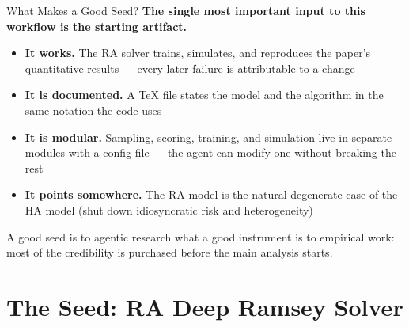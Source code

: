 \documentclass[10pt,aspectratio=169]{beamer}
\begin{document}
\begin{frame}{What Makes a Good Seed?}
\textbf{The single most important input to this workflow is the starting artifact.}

\medskip
\begin{itemize}
    \item \textbf{It works.} The RA solver trains, simulates, and reproduces the paper's
          quantitative results --- every later failure is attributable to a change
    \item \textbf{It is documented.} A TeX file states the model and the algorithm in the
          same notation the code uses
    \item \textbf{It is modular.} Sampling, scoring, training, and simulation live in
          separate modules with a config file --- the agent can modify one without breaking the rest
    \item \textbf{It points somewhere.} The RA model is the natural degenerate case of the
          HA model (shut down idiosyncratic risk and heterogeneity)
\end{itemize}

\medskip
\begin{block}{}
A good seed is to agentic research what a good instrument is to empirical work:
most of the credibility is purchased before the main analysis starts.
\end{block}
\end{frame}

\section{The Seed: RA Deep Ramsey Solver}
\end{document}
